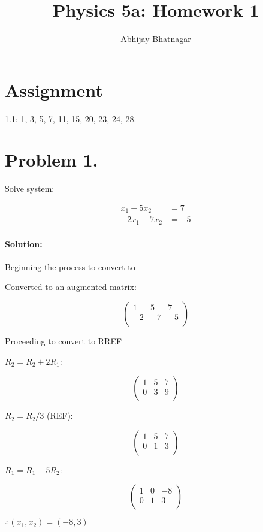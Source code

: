 \documentclass[11pt, notitlepage]{report}
\makeatletter
\newenvironment{solution}{\paragraph{\small Solution:}}{\hfill}
\newcommand*{\toccontents}{\@starttoc{toc}}
\makeatother
\begin{document}
   \title{Physics 5a: Homework 1}
   \author{Abhijay Bhatnagar}
   \maketitle
   \toccontents



\setcounter{secnumdepth}{0} %
\section{Assignment}

1.1: 1, 3, 5, 7, 11, 15, 20, 23, 24, 28.	

\newpage
\section{Problem 1.}

Solve system:

\begin{align}
	x_1+5x_2&=7 \\
	-2x_1-7x_2&=-5
\end{align}


\begin{solution}

Beginning the process to convert to 

Converted to an augmented matrix:

\[\left(
\begin{matrix}{}
  1& 5& 7 \\
  -2& -7& -5 \\
\end{matrix}
\right)\]
	

Proceeding to convert to RREF

$R_2 = R_2 + 2R_1$:

\[\left(
\begin{matrix}{}
  1& 5& 7 \\
  0& 3& 9 \\
\end{matrix}
\right)\]


$R_2 = R_2 / 3$ (REF):

\[\left(
\begin{matrix}{}
  1& 5& 7 \\
  0& 1& 3 \\
\end{matrix}
\right)\]

$R_1 = R_1 - 5R_2$:


\[\left(
\begin{matrix}{}
  1& 0& -8 \\
  0& 1& 3 \\
\end{matrix}
\right)\]

$\therefore (x_1,x_2)=(-8,3)$

\end{solution}
\end{document}
